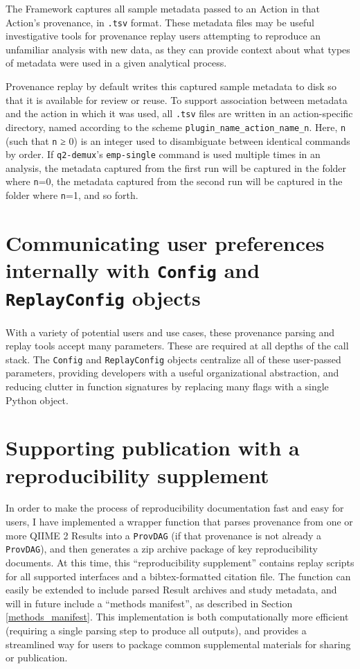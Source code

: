 The Framework captures all sample metadata passed to an Action in that Action’s
provenance, in \texttt{.tsv} format. These metadata files may be useful investigative
tools for provenance replay users attempting to reproduce an unfamiliar analysis
with new data, as they can provide context about what types of metadata were
used in a given analytical process.

Provenance replay by default writes this captured sample metadata to disk so
that it is available for review or reuse. To support association between
metadata and the action in which it was used, all \texttt{.tsv} files are written in an
action-specific directory, named according to the scheme
\texttt{plugin\_name\_action\_name\_n}. Here, \texttt{n} (such that \texttt{n} ≥ 0) is an integer used to
disambiguate between identical commands by order. If \texttt{q2-demux}’s \texttt{emp-single}
command is used multiple times in an analysis, the metadata captured from the first
run will be captured in the folder where \texttt{n}=0, the metadata captured from the second
run will be captured in the folder where \texttt{n}=1, and so forth.


\section{Communicating user preferences internally with \texttt{Config} and \texttt{ReplayConfig} objects}

With a variety of potential users and use cases, these provenance parsing and
replay tools accept many parameters. These are required at all depths of the
call stack. The \texttt{Config} and \texttt{ReplayConfig} objects centralize all of these
user-passed parameters, providing developers with a useful organizational
abstraction, and reducing clutter in function signatures by replacing many flags
with a single Python object. 


\section{Supporting publication with a reproducibility supplement}

In order to make the process of reproducibility documentation fast and easy for
users, I have implemented a wrapper function that parses provenance from one or
more QIIME 2 Results into a \texttt{ProvDAG} (if that provenance is not already a
\texttt{ProvDAG}), and then generates a zip archive package of key reproducibility
documents. At this time, this “reproducibility supplement” contains replay
scripts for all supported interfaces and a bibtex-formatted citation file. The
function can easily be extended to include parsed Result archives and study
metadata, and will in future include a “methods manifest”, as described in
Section \ref{methods_manifest}. This implementation is both computationally more efficient
(requiring a single parsing step to produce all outputs), and provides a
streamlined way for users to package common supplemental materials for sharing
or publication.
